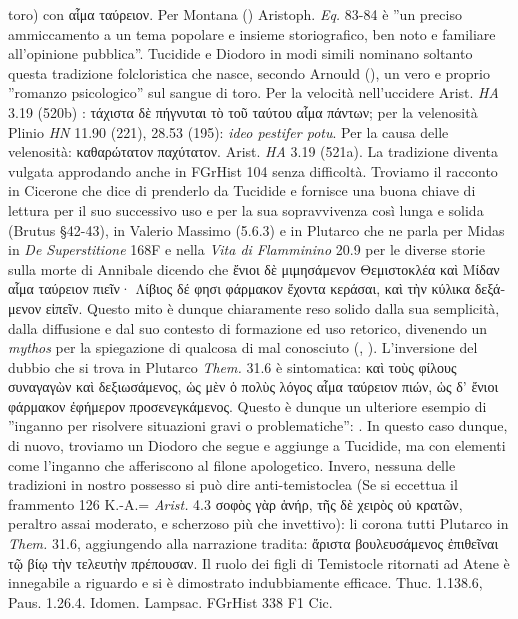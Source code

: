 {toro) con \textgreek{αἷμα ταύρειον}. Per Montana (\cite[291]{Montana2002}) Aristoph. \emph{Eq.} 83-84 è ''un preciso ammiccamento a un tema popolare e insieme storiografico, ben noto  e familiare all'opinione pubblica''. Tucidide e  Diodoro in modi simili nominano soltanto questa tradizione folcloristica che nasce, secondo Arnould (\cite*[230]{Arnould1993}), un vero e proprio ''romanzo psicologico'' sul sangue di toro. Per la velocità nell'uccidere Arist. \emph{HA} 3.19 (520b) : \textgreek{τάχιστα δὲ πήγνυται τὸ τοῦ ταύτου αἷμα πάντων}; per la velenosità Plinio \emph{HN} 11.90 (221), 28.53 (195): \emph{ideo pestifer potu}. Per la causa delle velenosità: \textgreek{καθαρώτατον παχύτατον}. Arist. \emph{HA} 3.19 (521a). La tradizione diventa vulgata approdando anche in FGrHist 104 senza difficoltà. Troviamo il racconto in Cicerone che dice di prenderlo da Tucidide e fornisce una buona chiave di lettura per il suo successivo uso e per la sua sopravvivenza così lunga e solida (Brutus §42-43), in Valerio Massimo (5.6.3) e in Plutarco che ne parla per Midas in \emph{De Superstitione} 168F e nella \emph{Vita di Flamminino} 20.9 per le diverse storie sulla morte di Annibale dicendo che \textgreek{ἔνιοι δὲ μιμησάμενον Θεμιστοκλέα καὶ Μίδαν αἷμα ταύρειον πιεῖν· Λίβιος δέ φησι φάρμακον ἔχοντα κεράσαι, καὶ τὴν κύλικα δεξάμενον εἰπεῖν}. Questo mito è dunque chiaramente reso solido dalla sua semplicità, dalla diffusione e dal suo contesto di formazione ed uso retorico, divenendo un \emph{mythos} per la spiegazione di qualcosa di mal conosciuto (\cite[230]{Arnould1993}, \cite[163]{Marr1996}). L'inversione del dubbio che si trova in Plutarco \emph{Them.}  31.6  è sintomatica: \textgreek{καὶ τοὺς φίλους συναγαγὼν καὶ δεξιωσάμενος, ὡς μὲν ὁ πολὺς λόγος αἷμα ταύρειον πιών, ὡς δ’ ἔνιοι φάρμακον ἐφήμερον προσενεγκάμενος}. Questo è dunque un ulteriore esempio di ''inganno per risolvere situazioni gravi o problematiche'': \cite[260]{Montana2002}. In questo caso dunque, di nuovo, troviamo un  Diodoro che segue e aggiunge a Tucidide, ma con elementi come l'inganno che afferiscono al filone apologetico. Invero, nessuna delle tradizioni in nostro possesso si può dire anti-temistoclea (Se si eccettua il frammento 126 K.-A.= \emph{Arist. }4.3 \textgreek{σοφὸς γὰρ ἁνήρ, τῆς δὲ χειρὸς οὐ κρατῶν}, peraltro assai moderato, e scherzoso più che invettivo): li corona tutti Plutarco in \emph{Them.}   31.6, aggiungendo alla narrazione tradita: \textgreek{ἄριστα βουλευσάμενος ἐπιθεῖναι τῷ βίῳ τὴν τελευτὴν πρέπουσαν}. Il ruolo dei figli di Temistocle ritornati ad Atene è innegabile a riguardo e si è dimostrato indubbiamente efficace. Thuc. 1.138.6, Paus. 1.26.4. Idomen. Lampsac. FGrHist 338 F1 Cic. }
